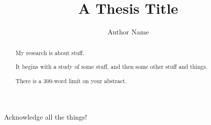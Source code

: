 
\title{A Thesis Title}
\author{Author Name}

\maketitle
\makedeclaration

\begin{abstract} %
My research is about stuff.

It begins with a study of some stuff, and then some other stuff and things.

There is a 300-word limit on your abstract.
\end{abstract}

\begin{acknowledgements}
Acknowledge all the things!
\end{acknowledgements}

\setcounter{tocdepth}{2} 

\tableofcontents
\listoffigures
\listoftables

